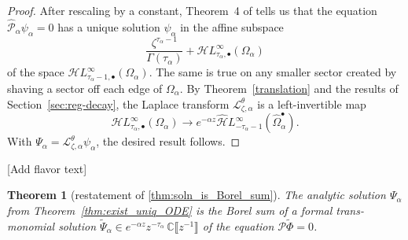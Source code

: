 \documentclass{article}
\newcommand{\singexp}[2]{\mathcal{H}L^\infty_{#1, #2}}
\newcommand{\singexpalg}[1]{\singexp{#1}{\bullet}}
\newcommand{\dualsingexp}[1]{\widehat{\mathcal{H}}L^\infty_{#1}}
\newcommand{\C}{\mathbb{C}}
\newcommand{\series}[1]{\tilde{#1}}
\newcommand{\laplace}{\mathcal{L}}
\theoremstyle{definition}
\theoremstyle{plain}
\newtheorem{theorem}{Theorem}[section]
\newenvironment{todo}{\color{Coral}}{\color{black}}
\begin{document}
\begin{center}
\label{fig:sectorial_domain--with roots P}
\end{center}
\begin{proof}
After rescaling by a constant, Theorem~4 of \cite{reg-sing-volterra} tells us that the equation $\hat{\mathcal{P}}_\alpha \psi_\alpha = 0$ has a unique solution $\psi_\alpha$ in the affine subspace
\[ \frac{\zeta^{\tau_\alpha-1}}{\Gamma(\tau_\alpha)} + \singexpalg{\tau_\alpha}(\Omega_\alpha) \]
of the space $\singexpalg{\tau_\alpha-1}(\Omega_\alpha)$. The same is true on any smaller sector created by shaving a sector off each edge of $\Omega_\alpha$. By Theorem~\ref{translation} and the results of Section~\ref{sec:reg-decay}, the Laplace transform $\laplace^\theta_{\zeta, \alpha}$ is a left-invertible map
\[ \singexpalg{\tau_\alpha}(\Omega_\alpha) \to e^{-\alpha z} \dualsingexp{-\tau_\alpha-1}(\widehat{\Omega}_\alpha^\bullet). \]
With $\Psi_\alpha = \laplace^\theta_{\zeta, \alpha} \psi_\alpha$, the desired result follows.
\end{proof}
\begin{todo}[Add flavor text]\end{todo}
\begin{theorem}[restatement of \ref{thm:soln_is_Borel_sum}]\label{re:thm:soln_is_Borel_sum}
The analytic solution $\Psi_\alpha$ from Theorem~\ref{thm:exist_uniq_ODE} is the Borel sum of a formal trans-monomial solution $\series{\Psi}_\alpha \in e^{-\alpha z} z^{-\tau_\alpha}\,\C \llbracket z^{-1} \rrbracket$ of the equation $\mathcal{P}\series{\Phi} = 0$.
\end{theorem}
\end{document}
